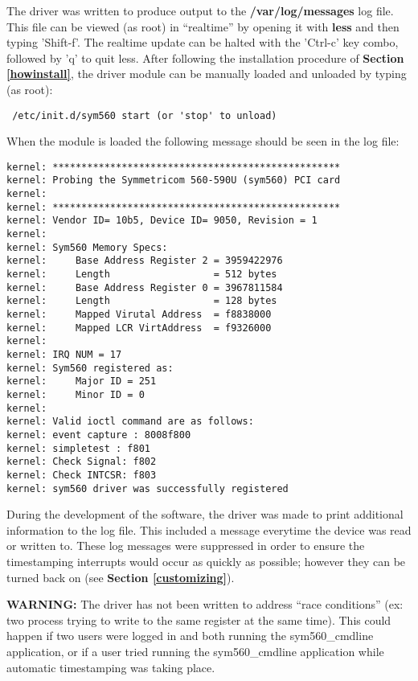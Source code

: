 \documentclass[11pt]{article}
\begin{document}
The driver was written to produce output to the \textbf{/var/log/messages} log file.  This file can be viewed (as root) in ``realtime'' by opening it with \textbf{less} and then typing 'Shift-f'.  The realtime update can be halted with the 'Ctrl-c' key combo, followed by 'q' to quit less.  After following the installation procedure of \textbf{Section \ref{howinstall}}, the driver module can be manually loaded and unloaded by typing (as root):
\begin{verbatim}
 /etc/init.d/sym560 start (or 'stop' to unload)
\end{verbatim}
When the module is loaded the following message should be seen in the log file:
\begin{small}
\begin{verbatim}
kernel: **************************************************
kernel: Probing the Symmetricom 560-590U (sym560) PCI card
kernel:
kernel: **************************************************
kernel: Vendor ID= 10b5, Device ID= 9050, Revision = 1
kernel:
kernel: Sym560 Memory Specs:
kernel:     Base Address Register 2 = 3959422976
kernel:     Length                  = 512 bytes
kernel:     Base Address Register 0 = 3967811584
kernel:     Length                  = 128 bytes
kernel:     Mapped Virutal Address  = f8838000
kernel:     Mapped LCR VirtAddress  = f9326000
kernel:
kernel: IRQ NUM = 17
kernel: Sym560 registered as:
kernel:     Major ID = 251
kernel:     Minor ID = 0
kernel:
kernel: Valid ioctl command are as follows:
kernel: event capture : 8008f800
kernel: simpletest : f801
kernel: Check Signal: f802
kernel: Check INTCSR: f803
kernel: sym560 driver was successfully registered
   \end{verbatim}
\end{small}

During the development of the software, the driver was made to print additional information to the log file.  This included a message everytime the device was read or written to.  These log messages were suppressed in order to ensure the timestamping interrupts would occur as quickly as possible; however they can be turned back on (see \textbf{Section \ref{customizing}}).

\noindent \textbf{WARNING:} The driver has not been written to address ``race conditions'' (ex: two process trying to write to the same register at the same time).  This could happen if two users were logged in and both running the sym560\_cmdline application, or if a user tried running the sym560\_cmdline application while automatic timestamping was taking place. 
\end{document}
